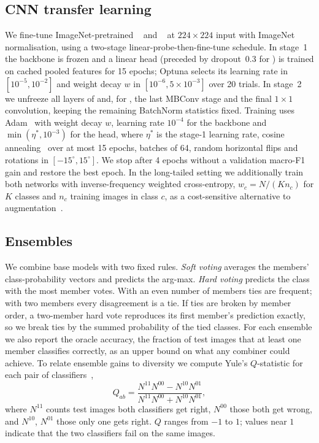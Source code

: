 \subsection{CNN transfer learning}
\label{sec:cnn}
We fine-tune ImageNet-pretrained \rn~\cite{he2016resnet} and \eb~\cite{tan2019efficientnet} at $224\times224$ input with ImageNet normalisation, using a two-stage linear-probe-then-fine-tune schedule.
In stage~1 the backbone is frozen and a linear head (preceded by dropout~0.3 for \eb) is trained on cached pooled features for 15 epochs; Optuna selects its learning rate in $[10^{-5},10^{-2}]$ and weight decay $w$ in $[10^{-6},5\times10^{-3}]$ over 20 trials.
In stage~2 we unfreeze all layers of \rn and, for \eb, the last MBConv stage and the final $1\times1$ convolution, keeping the remaining BatchNorm statistics fixed.
Training uses Adam~\cite{kingma2015adam} with weight decay $w$, learning rate $10^{-4}$ for the backbone and $\min(\eta^\ast, 10^{-3})$ for the head, where $\eta^\ast$ is the stage-1 learning rate, cosine annealing~\cite{loshchilov2017sgdr} over at most 15 epochs, batches of 64, random horizontal flips and rotations in $[-15^\circ,15^\circ]$.
We stop after 4 epochs without a validation macro-F1 gain and restore the best epoch.
In the long-tailed setting we additionally train both networks with inverse-frequency weighted cross-entropy, $w_c = N/(K n_c)$ for $K$ classes and $n_c$ training images in class $c$, as a cost-sensitive alternative to augmentation~\cite{he2009imbalanced,cui2019classbalanced}.

\subsection{Ensembles}
\label{sec:ensembles}
We combine base models with two fixed rules.
\emph{Soft voting} averages the members' class-probability vectors and predicts the arg-max.
\emph{Hard voting} predicts the class with the most member votes.
With an even number of members ties are frequent; with two members every disagreement is a tie.
If ties are broken by member order, a two-member hard vote reproduces its first member's prediction exactly, so we break ties by the summed probability of the tied classes.
For each ensemble we also report the oracle accuracy, the fraction of test images that at least one member classifies correctly, as an upper bound on what any combiner could achieve.
To relate ensemble gains to diversity we compute Yule's $Q$-statistic for each pair of classifiers~\cite{kuncheva2003diversity},
\begin{equation}
  Q_{ab} = \frac{N^{11}N^{00} - N^{10}N^{01}}{N^{11}N^{00} + N^{10}N^{01}},
  \label{eq:q}
\end{equation}
where $N^{11}$ counts test images both classifiers get right, $N^{00}$ those both get wrong, and $N^{10}$, $N^{01}$ those only one gets right.
$Q$ ranges from $-1$ to $1$; values near $1$ indicate that the two classifiers fail on the same images.


